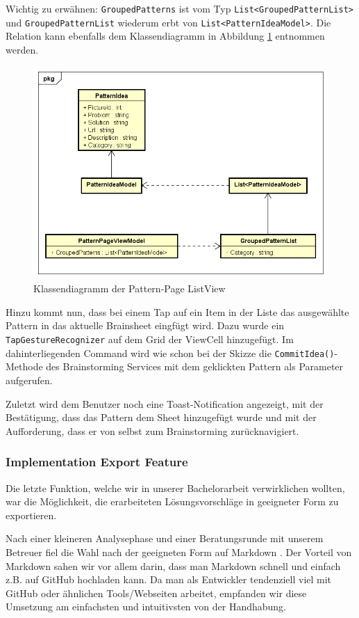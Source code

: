 Wichtig zu erwähnen: \texttt{GroupedPatterns} ist vom Typ \texttt{List<GroupedPatternList>} und \texttt{GroupedPatternList} wiederum erbt von \texttt{List<PatternIdeaModel>}. Die Relation kann ebenfalls dem Klassendiagramm in Abbildung \ref{fig:pattern-page-classdiagram} entnommen werden.
\begin{figure}[h]
	\centering
	\includegraphics[width=0.8\linewidth]{img/techn-bericht/pattern-page-classdiagram}
	\caption{Klassendiagramm der Pattern-Page ListView}
	\label{fig:pattern-page-classdiagram}
\end{figure}


Hinzu kommt nun, dass bei einem Tap auf ein Item in der Liste das ausgewählte Pattern in das aktuelle Brainsheet eingfügt wird. Dazu wurde ein \texttt{TapGestureRecognizer} auf dem Grid der ViewCell hinzugefügt. Im dahinterliegenden Command wird wie schon bei der Skizze die \texttt{CommitIdea()}-Methode des Brainstorming Services mit dem geklickten Pattern als Parameter aufgerufen. 

Zuletzt wird dem Benutzer noch eine Toast-Notification angezeigt, mit der Bestätigung, dass das Pattern dem Sheet hinzugefügt wurde und mit der Aufforderung, dass er von selbst zum Brainstorming zurücknavigiert.

\subsubsection{Implementation Export Feature}
Die letzte Funktion, welche wir in unserer Bachelorarbeit verwirklichen wollten, war die Möglichkeit, die erarbeiteten Lösungsvorschläge in geeigneter Form zu exportieren.

Nach einer kleineren Analysephase und einer Beratungsrunde mit unserem Betreuer fiel die Wahl nach der geeigneten Form auf Markdown \cite{markdown}. Der Vorteil von Markdown sahen wir vor allem darin, dass man Markdown schnell und einfach z.B. auf GitHub hochladen kann. Da man als Entwickler tendenziell viel mit GitHub oder ähnlichen Tools/Webseiten arbeitet, empfanden wir diese Umsetzung am  einfachsten und intuitivsten von der Handhabung.

